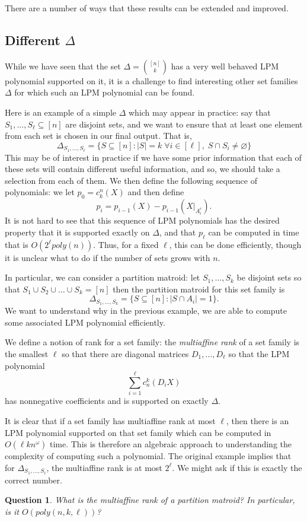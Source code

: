 \documentclass{amsart}
\newtheorem{question}[theorem]{Question}
\theoremstyle{definition}
\begin{document}
There are a number of ways that these results can be extended and improved.

\subsection{Different $\Delta$}
While we have seen that the set $\Delta = \binom{[n]}{k}$ has a very well behaved LPM polynomial supported on it, it is a challenge to find interesting other set families $\Delta$ for which such an LPM polynomial can be found.

Here is an example of a simple $\Delta$ which may appear in practice: say that $S_1,\dots, S_{\ell} \subseteq [n]$ are disjoint sets, and we want to ensure that at least one element from each set is chosen in our final output.
That is,
\[
    \Delta_{S_1, \dots, S_{\ell}} = \{S \subseteq [n] :|S| = k\;\forall i\in [\ell],\;S \cap S_i \neq \varnothing\}
\]
This may be of interest in practice if we have some prior information that each of these sets will contain different useful information, and so, we should take a selection from each of them.
We then define the following sequence of polynomials: we let $p_0 = c^n_k(X)$ and then define
\[
    p_i = p_{i-1}(X) - p_{i-1}(X|_{A_{i}^c}).
\]
It is not hard to see that this sequence of LPM polynomials has the desired property that it is supported exactly on $\Delta$, and that $p_{\ell}$ can be computed in time that is $O(2^{\ell}poly(n))$.
Thus, for a fixed $\ell$, this can be done efficiently, though it is unclear what to do if the number of sets grows with $n$.

In particular, we can consider a partition matroid: let $S_1, \dots, S_k$ be disjoint sets so that $S_1 \cup S_2 \cup \dots \cup S_k = [n]$ then the partition matroid for this set family is
\[
    \Delta_{S_1, \dots, S_k}  = \{S \subseteq [n] : |S \cap A_i| = 1\}.
\]
We want to understand why in the previous example, we are able to compute some associated LPM polynomial efficiently.

We define a notion of rank for a set family: the \emph{multiaffine rank} of a set family is the smallest $\ell$ so that there are diagonal matrices $D_1, \dots, D_{\ell}$ so that the LPM polynomial
\[
    \sum_{i=1}^{\ell} c_n^k(D_i X)
\]
has nonnegative coefficients and is supported on exactly $\Delta$.

It is clear that if a set family has multiaffine rank at most $\ell$, then there is an LPM polynomial supported on that set family which can be computed in $O(\ell k n^{\omega})$ time.
This is therefore an algebraic approach to understanding the complexity of computing such a polynomial.
The original example implies that for $\Delta_{S_1, \dots, S_{\ell}}$, the multiaffine rank is at most $2^{\ell}$.
We might ask if this is exactly the correct number.
\begin{question}
    What is the multiaffine rank of a partition matroid? In particular, is it $O(poly(n,k,\ell))$?
\end{question}
\end{document}

